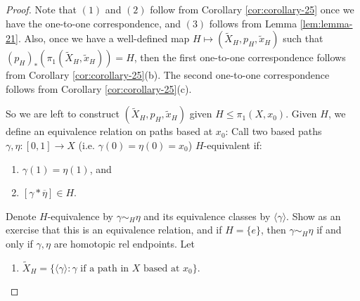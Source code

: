 \begin{proof}
  Note that $(1)$ and $(2)$ follow from
  Corollary \ref{cor:corollary-25} once we have the
  one-to-one correspondence, and
  $(3)$ follows from Lemma \ref{lem:lemma-21}. Also,
  once we have a well-defined map
  $H \mapsto (\widetilde{X}_H, p_H, \widetilde{x}_H)$ such
  that $(p_H)_*(\pi_1(\widetilde{X}_H, \widetilde{x}_H)) = H$,
  then the first one-to-one correspondence follows from
  Corollary \ref{cor:corollary-25}(b). The second
  one-to-one correspondence follows from
  Corollary \ref{cor:corollary-25}(c).

  So we are left to construct
  $(\widetilde{X}_H, p_H, \widetilde{x}_H)$ given
  $H \le \pi_1(X, x_0)$. Given $H$, we define an equivalence
  relation on paths based at $x_0$: Call two based paths
  $\gamma, \eta : [0, 1] \to X$ (i.e. $\gamma(0) = \eta(0) = x_0$) $H$-equivalent
  if:
  \begin{enumerate}
    \item $\gamma(1) = \eta(1)$, and
    \item $[\gamma * \overline{\eta}] \in H$.
  \end{enumerate}
  Denote $H$-equivalence by $\gamma \sim_H \eta$ and its
  equivalence classes by $\langle \gamma \rangle$.
  Show as an exercise that this is an equivalence relation, and
  if $H = \{e\}$, then $\gamma \sim_H \eta$ if and only
  if $\gamma, \eta$ are homotopic rel endpoints. Let
  \begin{enumerate}
    \item $\widetilde{X}_H = \{\langle \gamma \rangle : \gamma \text{ if a path in $X$ based at $x_0$}\}$.


\end{enumerate}
\end{proof}
